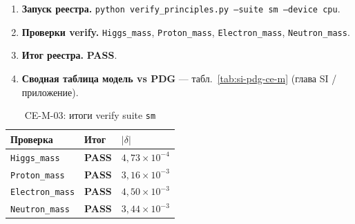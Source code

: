 \label{exp:cem03}
\begin{enumerate}[label=\textbf{Шаг \arabic*:},leftmargin=*,itemsep=0.35em]
\item \textbf{Запуск реестра.} \texttt{python verify\_principles.py --suite sm --device cpu}.
\item \textbf{Проверки verify.} \texttt{Higgs\_mass}, \texttt{Proton\_mass}, \texttt{Electron\_mass}, \texttt{Neutron\_mass}.
\item \textbf{Итог реестра.} \textbf{PASS}.
\item \textbf{Сводная таблица модель vs PDG} --- табл.~\ref{tab:si-pdg-ce-m} (глава SI / приложение).
\end{enumerate}
\medskip
\begin{table}[htbp]
\centering
\small
\caption{CE-M-03: итоги verify suite \texttt{sm}}
\label{tab:exp-ce-m-03-checks}
\begin{tabular}{@{}lll@{}}
\toprule
Проверка & Итог & $|\delta|$ \\
\midrule
\texttt{Higgs\_mass} & \textbf{PASS} & $4{,}73\times 10^{-4}$ \\
\texttt{Proton\_mass} & \textbf{PASS} & $3{,}16\times 10^{-3}$ \\
\texttt{Electron\_mass} & \textbf{PASS} & $4{,}50\times 10^{-3}$ \\
\texttt{Neutron\_mass} & \textbf{PASS} & $3{,}44\times 10^{-3}$ \\
\bottomrule
\end{tabular}
\end{table}
